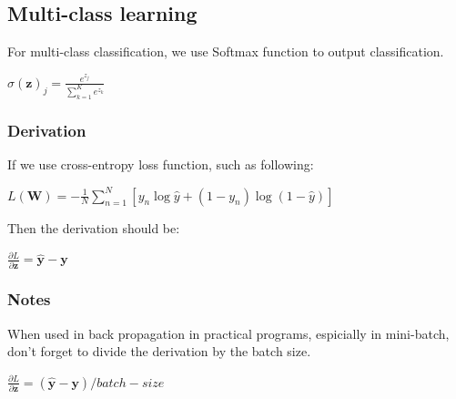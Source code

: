 \documentclass{article}
\begin{document}
	\subsection{Multi-class learning}
	For multi-class classification, we use Softmax function to output classification.
	\begin{center}
		$\sigma(\bm{z})_j = \frac{e^{z_j}}{\sum_{k=1}^{K}e^{z_k}}$
	\end{center}
	\subsubsection{Derivation}
	\begin{flushleft}
		If we use cross-entropy loss function, such as following:
	\end{flushleft}
	\begin{center}
		$L(\bm{W}) = - \frac{1}{N}\sum_{n=1}^{N}[y_n\log\hat{y}+(1-y_n)\log(1-\hat{y})]$
	\end{center}
	\begin{flushleft}
		Then the derivation should be:
	\end{flushleft}
	\begin{center}
		$\frac{\partial L}{\partial \bm{z}}= \bm{\hat{y}} - \bm{y}$
	\end{center}
	\subsubsection{Notes}
	\begin{flushleft}
		When used in back propagation in practical programs, espicially in mini-batch, don't forget to divide the derivation by the batch size.
	\end{flushleft}
	\begin{center}
		$\frac{\partial L}{\partial \bm{z}}= (\bm{\hat{y}} - \bm{y})/batch-size$
	\end{center}
\end{document}
